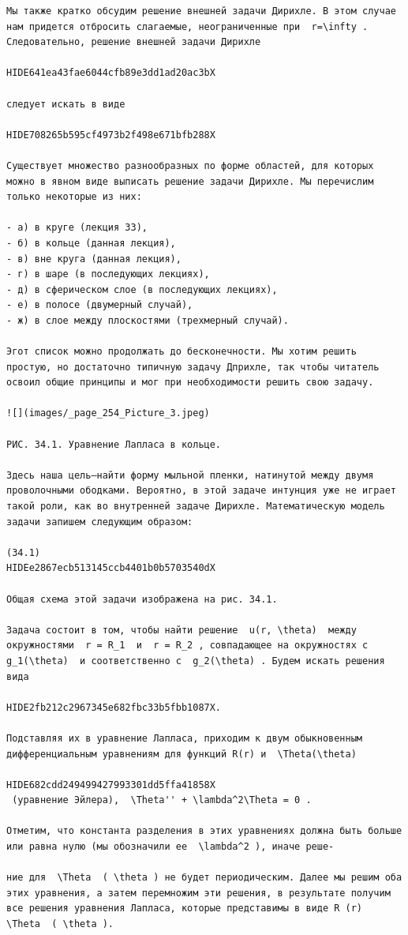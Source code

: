 \documentclass[
  ukrainian,
]{article}
\begin{document}
\begin{verbatim}
Мы также кратко обсудим решение внешней задачи Дирихле. В этом случае нам придется отбросить слагаемые, неограниченные при  r=\infty . Следовательно, решение внешней задачи Дирихле

HIDE641ea43fae6044cfb89e3dd1ad20ac3bX

следует искать в виде

HIDE708265b595cf4973b2f498e671bfb288X

Существует множество разнообразных по форме областей, для которых можно в явном виде выписать решение задачи Дирихле. Мы перечислим только некоторые из них:

- а) в круге (лекция 33),
- б) в кольце (данная лекция),
- в) вне круга (данная лекция),
- г) в шаре (в последующих лекциях),
- д) в сферическом слое (в последующих лекциях),
- е) в полосе (двумерный случай),
- ж) в слое между плоскостями (трехмерный случай).

Эгот список можно продолжать до бесконечности. Мы хотим решить простую, но достаточно типичную задачу Дприхле, так чтобы читатель освоил общие принципы и мог при необходимости решить свою задачу.

![](images/_page_254_Picture_3.jpeg)

РИС. 34.1. Уравнение Лапласа в кольце.

Здесь наша цель—найти форму мыльной пленки, натинутой между двумя проволочными ободками. Вероятно, в этой задаче интунция уже не играет такой роли, как во внутренней задаче Дирихле. Математическую модель задачи запишем следующим образом:

(34.1) 
HIDEe2867ecb513145ccb4401b0b5703540dX

Общая схема этой задачи изображена на рис. 34.1.

Задача состоит в том, чтобы найти решение  u(r, \theta)  между окружностями  r = R_1  и  r = R_2 , совпадающее на окружностях с  g_1(\theta)  и соответственно с  g_2(\theta) . Будем искать решения вида

HIDE2fb212c2967345e682fbc33b5fbb1087X.

Подставляя их в уравнение Лапласа, приходим к двум обыкновенным дифференциальным уравнениям для функций R(r) и  \Theta(\theta) 

HIDE682cdd249499427993301dd5ffa41858X
 (уравнение Эйлера),  \Theta'' + \lambda^2\Theta = 0 .

Отметим, что константа разделения в этих уравнениях должна быть больше или равна нулю (мы обозначили ее  \lambda^2 ), иначе реше-

ние для  \Theta  ( \theta ) не будет периодическим. Далее мы решим оба этих уравнения, а затем перемножим эти решения, в результате получим все решения уравнения Лапласа, которые представимы в виде R (r)  \Theta  ( \theta ).


\end{verbatim}
\end{document}
